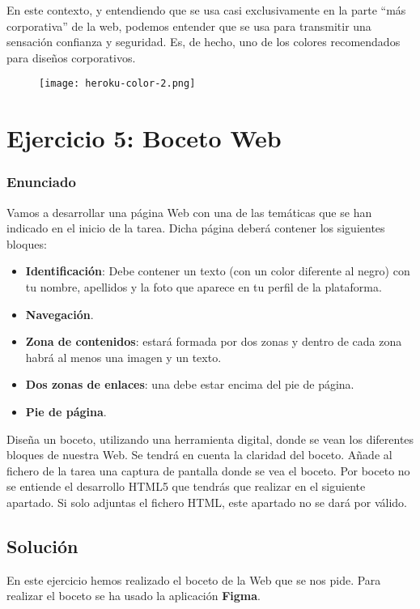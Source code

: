 \begin{enumerate}[label=\alph*)]
\begin{itemize}
\begin{itemize}
            En este contexto, y entendiendo que se usa casi exclusivamente en la parte ``más corporativa'' de la web, podemos entender que se usa para transmitir una sensación confianza y seguridad. Es, de hecho, uno de los colores recomendados para diseños corporativos.

            \begin{figure}[H]
                \centering
                \texttt{[image: heroku-color-2.png]}
            \end{figure}
        \end{itemize}
    \end{itemize}
\end{enumerate}

\section{Ejercicio 5: Boceto Web}
\subsubsection{Enunciado}
Vamos a desarrollar una página Web con una de las temáticas que se han indicado en el inicio de la tarea. Dicha página deberá contener los siguientes bloques:
\begin{itemize}
    \item \textbf{Identificación}: Debe contener un texto (con un color diferente al negro) con tu nombre, apellidos y la foto que aparece en tu perfil de la plataforma.
    \item \textbf{Navegación}.
    \item \textbf{Zona de contenidos}: estará formada por dos zonas y dentro de cada zona habrá al menos una imagen y un texto.
    \item \textbf{Dos zonas de enlaces}: una debe estar encima del pie de página.
    \item \textbf{Pie de página}.
\end{itemize}

Diseña un boceto, utilizando una herramienta digital, donde se vean los diferentes bloques de nuestra Web. Se tendrá en cuenta la claridad del boceto. Añade al fichero de la tarea una captura de pantalla donde se vea el boceto. Por boceto no se entiende el desarrollo HTML5 que tendrás que realizar en el siguiente apartado. Si solo adjuntas el fichero HTML, este apartado no se dará por válido.

\subsection{Solución}
En este ejercicio hemos realizado el boceto de la Web que se nos pide. Para realizar el boceto se ha usado la aplicación \textbf{Figma}.

